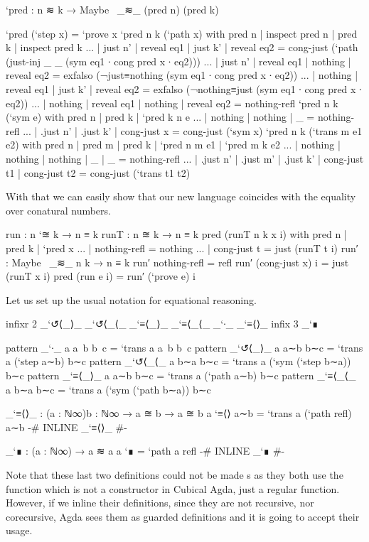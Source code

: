 \begin{code}
`pred : n ≋ k → Maybe~ _≋_ (pred n) (pred k)
\end{code}
\begin{code}[hide]
`pred (`step x) = `prove x
`pred {n} {k} (`path x) with pred n | inspect pred n | pred k | inspect pred k
... | just n' | reveal eq1 | just k' | reveal eq2 = cong-just (`path (just-inj _ _ (sym eq1 ∙ cong pred x ∙ eq2)))
... | just n' | reveal eq1 | nothing | reveal eq2 = exfalso (¬just≡nothing (sym eq1 ∙ cong pred x ∙ eq2))
... | nothing | reveal eq1 | just k' | reveal eq2 = exfalso (¬nothing≡just (sym eq1 ∙ cong pred x ∙ eq2))
... | nothing | reveal eq1 | nothing | reveal eq2 = nothing-refl
`pred {n} {k} (`sym e) with pred n | pred k | `pred {k} {n} e
... | nothing  | nothing  | _ = nothing-refl
... | .just n' | .just k' | cong-just x = cong-just (`sym x)
`pred {n} {k} (`trans {m} e1 e2) with pred n | pred m | pred k | `pred {n} {m} e1 | `pred {m} {k} e2
... | nothing  | nothing  | nothing  | _  | _  = nothing-refl
... | .just n' | .just m' | .just k' | cong-just t1 | cong-just t2 = cong-just (`trans t1 t2)
\end{code}

With that we can easily show that our new language coincides with the equality over conatural numbers.

\begin{code}
run : n `≋ k → n ≡ k
runT : n ≋ k → n ≡ k
pred (runT {n} {k} x i) with {pred n} | {pred k} | `pred x
... | nothing-refl = nothing
... | cong-just t = just (runT t i)
run′ : Maybe~ _≋_ n k → n ≡ k
run′ nothing-refl = refl
run′ (cong-just x) i = just (runT x i)
pred (run e i) = run′ (`prove e) i
\end{code}

Let us set up the usual notation for equational reasoning.

\begin{code}[hide]
infixr 2 _`↺⟨_⟩_ _`↺⟨_⟨_ _`≡⟨_⟩_ _`≡⟨_⟨_ _`∙_ _`≡⟨⟩_
infix  3 _`∎
\end{code}
\begin{code}
pattern _`∙_  {a} a~b b~c = `trans {a} a~b b~c
pattern _`↺⟨_⟩_ a a∼b b∼c = `trans {a} (`step a∼b) b∼c
pattern _`↺⟨_⟨_ a b∼a b∼c = `trans {a} (`sym (`step b∼a)) b∼c
pattern _`≡⟨_⟩_ a a∼b b∼c = `trans {a} (`path a∼b) b∼c
pattern _`≡⟨_⟨_ a b∼a b∼c = `trans {a} (`sym (`path b∼a)) b∼c

_`≡⟨⟩_ : (a : ℕ∞){b : ℕ∞} → a ≋ b → a ≋ b
a `≡⟨⟩ a∼b = `trans {a} (`path refl) a∼b
{-# INLINE _`≡⟨⟩_ #-}

_`∎ : (a : ℕ∞) → a ≋ a
a `∎ = `path {a} refl
{-# INLINE _`∎ #-}
\end{code}

Note that these last two definitions could not be made s
as they both use the  function which is not a constructor
in Cubical Agda, just a regular function. However, if we inline their definitions,
since they are not recursive, nor corecursive, Agda sees them as guarded definitions
and it is going to accept their usage.
